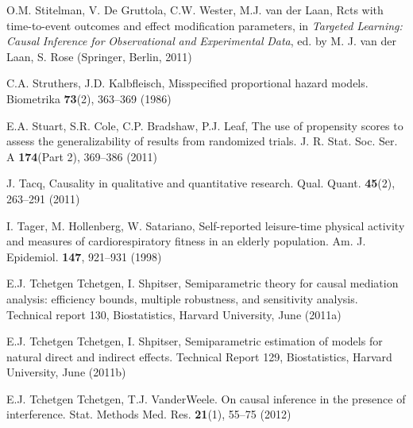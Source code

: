 \begin{list}{}{\setlength{\leftmargin}{2.1em}\setlength{\labelwidth}{0pt}
  \setlength{\labelsep}{0pt}\setlength{\itemindent}{-2.1em}
  \setlength{\parsep}{0pt}\setlength{\itemsep}{2pt}\setlength{\topsep}{0pt}}
\item\label{refentry:REF392}O.M. Stitelman, V. De Gruttola, C.W. Wester, M.J. van der Laan, Rcts with time-to-event outcomes and effect modification parameters, in \textit{Targeted} \textit{Learning:} \textit{Causal} \textit{Inference} \textit{for} \textit{Observational} \textit{and} \textit{Experimental} \textit{Data}, ed. by M. J. van der Laan, S. Rose (Springer, Berlin, 2011)\label{refend:REF392}
\item\label{refentry:REF393}C.A. Struthers, J.D. Kalbfleisch, Misspecified proportional hazard models. Biometrika \textbf{73}(2), 363--369 (1986)\label{refend:REF393}
\item\label{refentry:REF394}E.A. Stuart, S.R. Cole, C.P. Bradshaw, P.J. Leaf, The use of propensity scores to assess the generalizability of results from randomized trials. J. R. Stat. Soc. Ser. A \textbf{174}(Part 2), 369--386 (2011)\label{refend:REF394}
\item\label{refentry:REF395}J. Tacq, Causality in qualitative and quantitative research. Qual. Quant. \textbf{45}(2), 263--291 (2011)\label{refend:REF395}
\item\label{refentry:REF396}I. Tager, M. Hollenberg, W. Satariano, Self-reported leisure-time physical activity and measures of cardiorespiratory fitness in an elderly population. Am. J. Epidemiol. \textbf{147}, 921--931 (1998)\label{refend:REF396}
\item\label{refentry:REF397}E.J. Tchetgen Tchetgen, I. Shpitser, Semiparametric theory for causal mediation analysis: efficiency bounds, multiple robustness, and sensitivity analysis. Technical report 130, Biostatistics, Harvard University, June (2011a)\label{refend:REF397}
\item\label{refentry:REF398}E.J. Tchetgen Tchetgen, I. Shpitser, Semiparametric estimation of models for natural direct and indirect effects. Technical Report 129, Biostatistics, Harvard University, June (2011b)\label{refend:REF398}
\item\label{refentry:REF399}E.J. Tchetgen Tchetgen, T.J. VanderWeele. On causal inference in the presence of interference. Stat. Methods Med. Res. \textbf{21}(1), 55--75 (2012)\label{refend:REF399}

\end{list}
